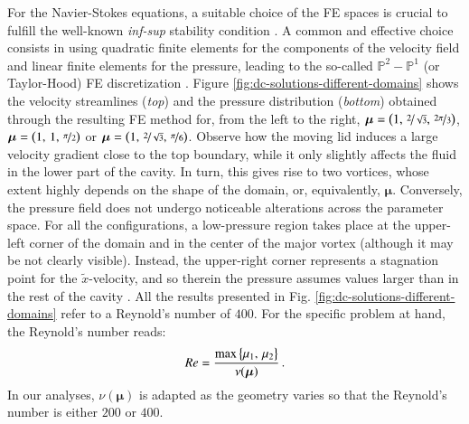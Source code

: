 \documentclass[longtitle]{elsarticle}
\numberwithin{equation}{section}
\theoremstyle{theorem}
\theoremstyle{definition}
\theoremstyle{remark}
\theoremstyle{proposition}
\numberwithin{figure}{section}
\newcommand{\wt}[1]{\widetilde{#1}}
\newcommand{\bg}[1]{\boldsymbol{#1}}
\begin{document}
		For the Navier-Stokes equations, a suitable choice of the FE spaces is crucial to fulfill the well-known \emph{inf-sup} stability condition \cite{Ran99}. A common and effective choice consists in using quadratic finite elements for the components of the velocity field and linear finite elements for the pressure, leading to the so-called $\mathbb{P}^2 - \mathbb{P}^1$ (or Taylor-Hood) FE discretization \cite{Per02}. Figure \ref{fig:dc-solutions-different-domains} shows the velocity streamlines (\emph{top}) and the pressure distribution (\emph{bottom}) obtained through the resulting FE method for, from the left to the right, $\bg{\mu} = \big( 1, \, \nicefrac{2}{\sqrt{3}}, \, \nicefrac{2 \pi}{3} \big)$, $\bg{\mu} = \big( 1, \, 1, \, \nicefrac{\pi}{2} \big)$ or $\bg{\mu} = \big( 1, \, \nicefrac{2}{\sqrt{3}}, \, \nicefrac{\pi}{6} \big)$. Observe how the moving lid induces a large velocity gradient close to the top boundary, while it only slightly affects the fluid in the lower part of the cavity. In turn, this gives rise to two vortices, whose extent highly depends on the shape of the domain, or, equivalently, $\bg{\mu}$. Conversely, the pressure field does not undergo noticeable alterations across the parameter space. For all the configurations, a low-pressure region takes place at the upper-left corner of the domain and in the center of the major vortex (although it may be not clearly visible). Instead, the upper-right corner represents a stagnation point for the $\wt{x}$-velocity, and so therein the pressure assumes values larger than in the rest of the cavity \cite{Dho14}. All the results presented in Fig. \ref{fig:dc-solutions-different-domains} refer to a Reynold's number of $400$. For the specific problem at hand, the Reynold's number reads:
		\begin{equation*}
			\vspace*{-0.1cm}
			Re = \dfrac{\max \big\lbrace \mu_1, \, \mu_2 \big\rbrace}{\nu(\bg{\mu})} \, .
		\end{equation*}
		In our analyses, $\nu(\bg{\mu})$ is adapted as the geometry varies so that the Reynold's number is either $200$ or $400$. 
\end{document}
